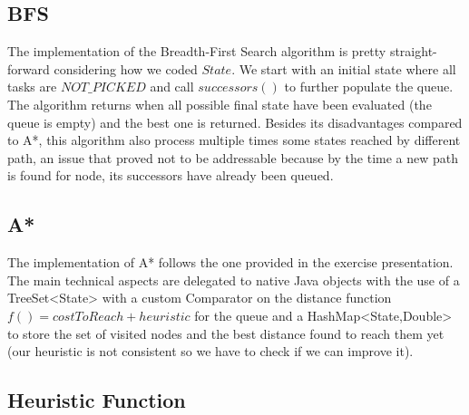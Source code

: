 \documentclass[11pt]{article}
\begin{document}
\subsection{BFS}
The implementation of the Breadth-First Search algorithm is pretty straight-forward considering how we coded $State$. We start with an initial state where all tasks are $NOT\_PICKED$ and call $successors()$ to further populate the queue. The algorithm returns when all possible final state have been evaluated (the queue is empty) and the best one is returned. Besides its disadvantages compared to A*, this algorithm also process multiple times some states reached by different path, an issue that proved not to be addressable because by the time a new path is found for node, its successors have already been queued.    

\subsection{A*}
The implementation of A* follows the one provided in the exercise presentation. The main technical aspects are delegated to native Java objects with the use of a TreeSet<State> with a custom Comparator on the distance function $f()=costToReach+heuristic$ for the queue and a HashMap<State,Double> to store the set of visited nodes and the best distance found to reach them yet (our heuristic is not consistent so we have to check if we can improve it).


\subsection{Heuristic Function}
\end{document}
